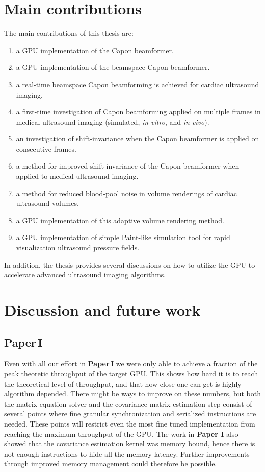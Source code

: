 \section{Main contributions}
The main contributions of this thesis are:
\begin{enumerate}
\item a GPU implementation of the Capon beamformer.
\item a GPU implementation of the beamspace Capon beamformer.
\item a real-time beamspace Capon beamforming is achieved for cardiac ultrasound imaging.
\item a first-time investigation of Capon beamforming applied on multiple frames in medical ultrasound imaging (simulated, \textit{in vitro}, and \textit{in vivo}).
\item an investigation of shift-invariance when the Capon beamformer is applied on consecutive frames.
\item a method for improved shift-invariance of the Capon beamformer when applied to medical ultrasound imaging.
\item a method for reduced blood-pool noise in volume renderings of cardiac ultrasound volumes.
\item a GPU implementation of this adaptive volume rendering method.
\item a GPU implementation of simple Paint-like simulation tool for rapid visualization ultrasound pressure fields.
\end{enumerate}
In addition, the thesis provides several discussions on how to utilize the GPU to accelerate advanced ultrasound imaging algorithms. 

\section{Discussion and future work}
\subsection{Paper\,I}
Even with all our effort in \textbf{Paper\,I} we were only able to achieve a fraction of the peak theoretic throughput of the target GPU. This shows how hard it is to reach the theoretical level of throughput, and that how close one can get is highly algorithm depended. There might be ways to improve on these numbers, but both the matrix equation solver and the covariance matrix estimation step consist of several points where fine granular synchronization and serialized instructions are needed. These points will restrict even the most fine tuned implementation from reaching the maximum throughput of the GPU. The work in \textbf{Paper I} also showed that the covariance estimation kernel was memory bound, hence there is not enough instructions to hide all the memory latency. Further improvements through improved memory management could therefore be possible. 

